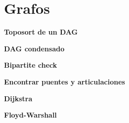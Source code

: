 \section{Grafos}
    \textbf{Toposort de un DAG}
    

    \textbf{DAG condensado}
    

    \textbf{Bipartite check}
    

    \textbf{Encontrar puentes y articulaciones}
    

    \textbf{Dijkstra}
    

    \textbf{Floyd-Warshall}
    
